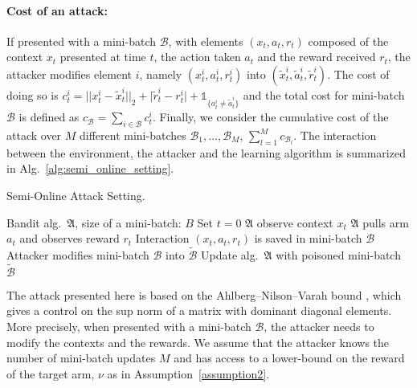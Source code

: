\paragraph{Cost of an attack:} If presented with a mini-batch $\mathcal{B}$, with elements $(x_{t}, a_{t}, r_{t})$ composed of the context $x_{t}$ presented at time $t$, the action taken $a_{t}$ and the reward received $r_{t}$, the attacker modifies element $i$, namely  $(x^{i}_{t}, a^{i}_{t}, r^{i}_{t})$ into $(\tilde{x}^{i}_{t}, \tilde{a}^{i}_{t}, \tilde{r}^{i}_{t})$. The cost of doing so is $c^{i}_{t} = ||x^{i}_{t} - \tilde{x}^{i}_{t}||_{2} + \big|\tilde{r}^{i}_{t} - r^{i}_{t}\big| + \mathds{1}_{\{a^{i}_{t} \neq \tilde{a}^{i}_{t}\}}$ and the total cost for mini-batch $\mathcal{B}$ is defined as $c_{\mathcal{B}} = \sum_{i\in \mathcal{B}} c_{t}^{i}$. Finally, we consider the cumulative cost of the attack over $M$ different mini-batches $\mathcal{B}_{1}, \hdots, \mathcal{B}_{M}$, $\sum_{l=1}^{M} c_{\mathcal{B}_{l}}$. The interaction between the environment, the attacker and the learning algorithm is summarized in Alg.~\ref{alg:semi_online_setting}.  
\begin{algorithm}[h]
	\caption{Semi-Online Attack Setting.}
  \label{alg:semi_online_setting}
\begin{algorithmic}
   Bandit alg.~$\mathfrak{A}$, size of a mini-batch: $B$
  \STATE Set $t = 0$
  \STATE $\mathfrak{A}$ observe context $x_{t}$
  \STATE $\mathfrak{A}$ pulls arm $a_{t}$ and observes reward $r_{t}$
  \STATE Interaction $(x_{t}, a_{t}, r_{t})$ is saved in mini-batch $\mathcal{B}$
  \STATE Attacker modifies mini-batch $\mathcal{B}$ into $\tilde{\mathcal{B}}$
  \STATE Update alg.~$\mathfrak{A}$ with poisoned mini-batch $\tilde{\mathcal{B}}$
  \ENDIF
  \ENDWHILE
\end{algorithmic}
\end{algorithm}



The attack presented here is based on the Ahlberg–Nilson–Varah bound \cite{varah1975lower}, which gives a control on the sup norm of a matrix with dominant diagonal elements. More precisely, when presented with a mini-batch $\mathcal{B}$, the attacker needs to modify the contexts and the rewards. We assume that the attacker knows the number of mini-batch updates $M$ and has access to a lower-bound on the reward of the target arm, $\nu$ as in Assumption~\ref{assumption2}. 

